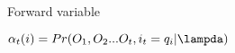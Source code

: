 \begin{frame}

Forward variable

$\alpha_t(i) = Pr(O_1, O_2 ... O_t, i_t = q_i \vert \lampda)$




\end{frame}



















